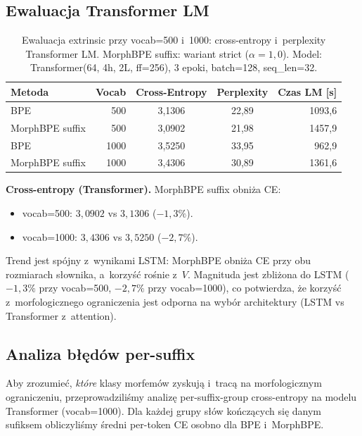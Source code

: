 \subsection*{Ewaluacja Transformer LM}

\begin{table}[h]
  \centering
  \caption{Ewaluacja extrinsic przy vocab=500 i~1000: cross-entropy i~perplexity Transformer LM.
  MorphBPE suffix: wariant strict ($\alpha = 1{,}0$).
  Model: Transformer(64, 4h, 2L, ff=256), 3 epoki, batch=128, seq\_len=32.}
  \label{tab:transformer}
  \begin{tabular}{lrccr}
    \toprule
    Metoda & Vocab & Cross-Entropy & Perplexity & Czas LM [s] \\
    \midrule
    BPE                  & 500  & 3{,}1306 & 22{,}89 & 1093{,}6 \\
    MorphBPE suffix      & 500  & 3{,}0902 & 21{,}98 & 1457{,}9 \\
    \addlinespace
    BPE                  & 1000 & 3{,}5250 & 33{,}95 & 962{,}9 \\
    MorphBPE suffix      & 1000 & 3{,}4306 & 30{,}89 & 1361{,}6 \\
    \bottomrule
  \end{tabular}
\end{table}

\textbf{Cross-entropy (Transformer).} MorphBPE suffix obniża CE:
\begin{itemize}
  \item vocab=500: $3{,}0902$ vs $3{,}1306$ ($-1{,}3\%$).
  \item vocab=1000: $3{,}4306$ vs $3{,}5250$ ($-2{,}7\%$).
\end{itemize}
Trend jest spójny z~wynikami LSTM: MorphBPE obniża CE przy obu
rozmiarach słownika, a~korzyść rośnie z~$V$. Magnituda jest
zbliżona do LSTM ($-1{,}3\%$ przy vocab=500, $-2{,}7\%$ przy vocab=1000),
co potwierdza, że korzyść z~morfologicznego ograniczenia jest
odporna na wybór architektury (LSTM vs Transformer z~attention).

\subsection*{Analiza błędów per-suffix}

Aby zrozumieć, \emph{które} klasy morfemów zyskują i~tracą
na morfologicznym ograniczeniu, przeprowadziliśmy analizę
per-suffix-group cross-entropy na modelu Transformer (vocab=1000).
Dla każdej grupy słów kończących się danym sufiksem obliczyliśmy
średni per-token CE osobno dla BPE i~MorphBPE.

